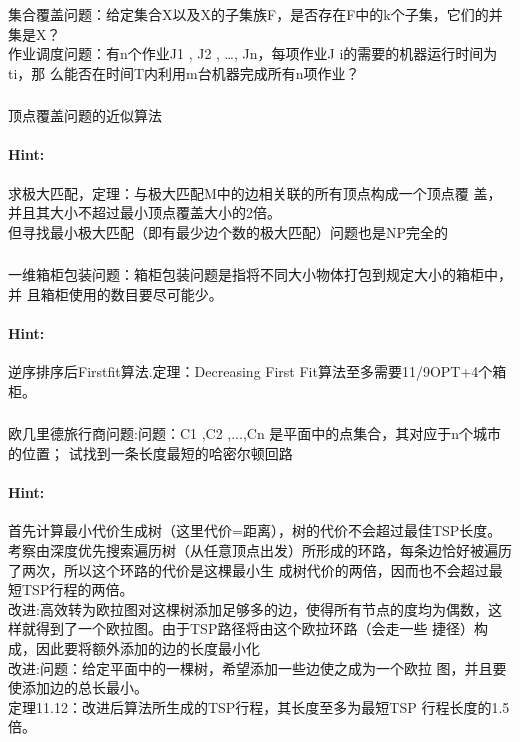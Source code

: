 \documentclass{article}
\begin{document}
集合覆盖问题：给定集合X以及X的子集族F，是否存在F中的k个子集，它们的并
集是X？\\
作业调度问题：有n个作业J1
, J2
, …, Jn，每项作业J
i的需要的机器运行时间为ti，那
么能否在时间T内利用m台机器完成所有n项作业？\\


    \subsubsection{}顶点覆盖问题的近似算法
  \paragraph{Hint:}求极大匹配，定理：与极大匹配M中的边相关联的所有顶点构成一个顶点覆
盖，并且其大小不超过最小顶点覆盖大小的2倍。\\
但寻找最小极大匹配（即有最少边个数的极大匹配）问题也是NP完全的


 \subsubsection{}一维箱柜包装问题：箱柜包装问题是指将不同大小物体打包到规定大小的箱柜中，并
且箱柜使用的数目要尽可能少。
\paragraph{Hint:}逆序排序后Firstfit算法.定理：Decreasing First Fit算法至多需要11/9OPT+4个箱柜。

 \subsubsection{}欧几里德旅行商问题:问题：C1
,C2
,...,Cn 是平面中的点集合，其对应于n个城市的位置；
试找到一条长度最短的哈密尔顿回路

\paragraph{Hint:}首先计算最小代价生成树（这里代价=距离），树的代价不会超过最佳TSP长度。考察由深度优先搜索遍历树（从任意顶点出发）所形成的环路，每条边恰好被遍历了两次，所以这个环路的代价是这棵最小生
成树代价的两倍，因而也不会超过最短TSP行程的两倍。\\
改进:高效转为欧拉图对这棵树添加足够多的边，使得所有节点的度均为偶数，这样就得到了一个欧拉图。由于TSP路径将由这个欧拉环路（会走一些
捷径）构成，因此要将额外添加的边的长度最小化\\
改进:问题：给定平面中的一棵树，希望添加一些边使之成为一个欧拉
图，并且要使添加边的总长最小。\\
定理11.12：改进后算法所生成的TSP行程，其长度至多为最短TSP
行程长度的1.5倍。\\
\end{document}
